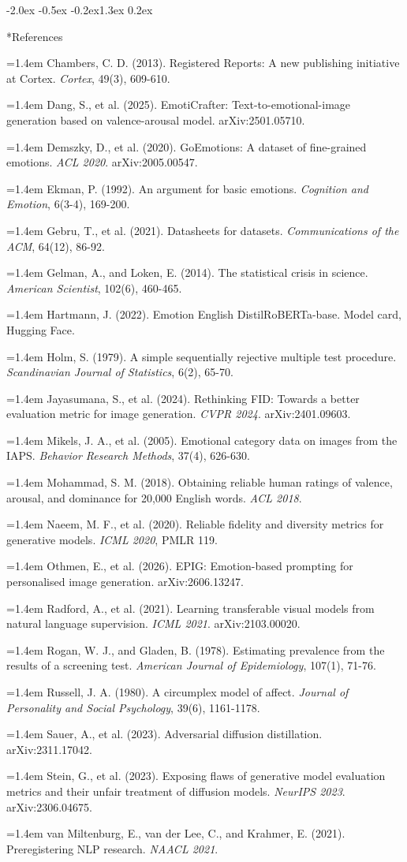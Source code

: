 \documentclass[10pt]{article}
\makeatletter
\renewcommand\section{\@startsection{section}{1}{\z@}%
  {-2.0ex \@plus -0.5ex \@minus -0.2ex}{1.3ex \@plus 0.2ex}{\large\bfseries\raggedright}}
\newcommand{\refentry}[1]{\par\noindent\hangindent=1.4em\hangafter=1 {\small #1}\par}
\makeatother
\begin{document}
\section*{References}
\refentry{Chambers, C. D. (2013). Registered Reports: A new publishing initiative at Cortex. \emph{Cortex}, 49(3), 609-610.}
\refentry{Dang, S., et al. (2025). EmotiCrafter: Text-to-emotional-image generation based on valence-arousal model. arXiv:2501.05710.}
\refentry{Demszky, D., et al. (2020). GoEmotions: A dataset of fine-grained emotions. \emph{ACL 2020}. arXiv:2005.00547.}
\refentry{Ekman, P. (1992). An argument for basic emotions. \emph{Cognition and Emotion}, 6(3-4), 169-200.}
\refentry{Gebru, T., et al. (2021). Datasheets for datasets. \emph{Communications of the ACM}, 64(12), 86-92.}
\refentry{Gelman, A., and Loken, E. (2014). The statistical crisis in science. \emph{American Scientist}, 102(6), 460-465.}
\refentry{Hartmann, J. (2022). Emotion English DistilRoBERTa-base. Model card, Hugging Face.}
\refentry{Holm, S. (1979). A simple sequentially rejective multiple test procedure. \emph{Scandinavian Journal of Statistics}, 6(2), 65-70.}
\refentry{Jayasumana, S., et al. (2024). Rethinking FID: Towards a better evaluation metric for image generation. \emph{CVPR 2024}. arXiv:2401.09603.}
\refentry{Mikels, J. A., et al. (2005). Emotional category data on images from the IAPS. \emph{Behavior Research Methods}, 37(4), 626-630.}
\refentry{Mohammad, S. M. (2018). Obtaining reliable human ratings of valence, arousal, and dominance for 20,000 English words. \emph{ACL 2018}.}
\refentry{Naeem, M. F., et al. (2020). Reliable fidelity and diversity metrics for generative models. \emph{ICML 2020}, PMLR 119.}
\refentry{Othmen, E., et al. (2026). EPIG: Emotion-based prompting for personalised image generation. arXiv:2606.13247.}
\refentry{Radford, A., et al. (2021). Learning transferable visual models from natural language supervision. \emph{ICML 2021}. arXiv:2103.00020.}
\refentry{Rogan, W. J., and Gladen, B. (1978). Estimating prevalence from the results of a screening test. \emph{American Journal of Epidemiology}, 107(1), 71-76.}
\refentry{Russell, J. A. (1980). A circumplex model of affect. \emph{Journal of Personality and Social Psychology}, 39(6), 1161-1178.}
\refentry{Sauer, A., et al. (2023). Adversarial diffusion distillation. arXiv:2311.17042.}
\refentry{Stein, G., et al. (2023). Exposing flaws of generative model evaluation metrics and their unfair treatment of diffusion models. \emph{NeurIPS 2023}. arXiv:2306.04675.}
\refentry{van Miltenburg, E., van der Lee, C., and Krahmer, E. (2021). Preregistering NLP research. \emph{NAACL 2021}.}
\end{document}
